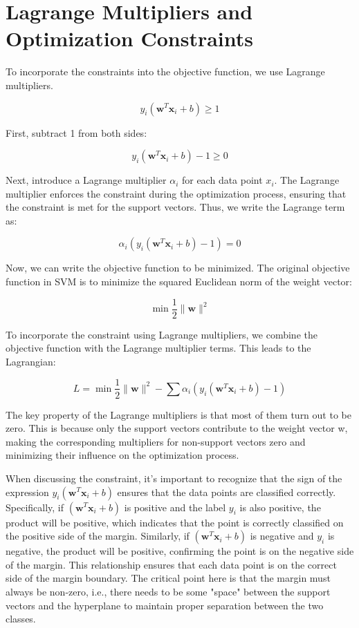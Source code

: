 \section{Lagrange Multipliers and Optimization Constraints}

To incorporate the constraints into the objective function, we use Lagrange multipliers.

\[
y_i (\mathbf{w}^T \mathbf{x}_i + b) \geq 1
\]

First, subtract 1 from both sides:

\[
y_i (\mathbf{w}^T \mathbf{x}_i + b) - 1 \geq 0
\]

Next, introduce a Lagrange multiplier \( \alpha_i \) for each data point \( x_i \). The Lagrange multiplier enforces the constraint during the optimization process, ensuring that the constraint is met for the support vectors. Thus, we write the Lagrange term as:

\[
\alpha_i \left( y_i (\mathbf{w}^T \mathbf{x}_i + b) - 1 \right) = 0
\]

Now, we can write the objective function to be minimized. The original objective function in SVM is to minimize the squared Euclidean norm of the weight vector:

\[
\min \frac{1}{2} \| \mathbf{w} \|^2
\]

To incorporate the constraint using Lagrange multipliers, we combine the objective function with the Lagrange multiplier terms. This leads to the Lagrangian:

\[
L = \min \frac{1}{2} \| \mathbf{w} \|^2 - \sum \alpha_i \left( y_i (\mathbf{w}^T \mathbf{x}_i + b) - 1 \right)
\]

The key property of the Lagrange multipliers is that most of them turn out to be zero. This is because only the support vectors contribute to the weight vector w, making the corresponding multipliers for non-support vectors zero and minimizing their influence on the optimization process.

When discussing the constraint, it's important to recognize that the sign of the expression \( y_i (\mathbf{w}^T \mathbf{x}_i + b) \) ensures that the data points are classified correctly. Specifically, if \( (\mathbf{w}^T \mathbf{x}_i + b) \) is positive and the label \( y_i \) is also positive, the product will be positive, which indicates that the point is correctly classified on the positive side of the margin. Similarly, if \( (\mathbf{w}^T \mathbf{x}_i + b) \) is negative and \( y_i \) is negative, the product will be positive, confirming the point is on the negative side of the margin. This relationship ensures that each data point is on the correct side of the margin boundary. The critical point here is that the margin must always be non-zero, i.e., there needs to be some "space" between the support vectors and the hyperplane to maintain proper separation between the two classes.


